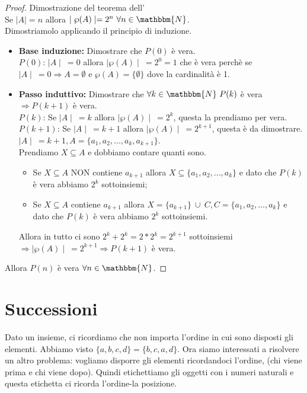 \documentclass[12pt, letterpaper]{report}
\newcommand{\namerefl}[1]{%
	\bgroup
	\let\nmu\MakeLowercase
	\nameref{#1}\egroup}
\newcommand{\nmu}{}
\begin{document}
 		\begin{proof}{Dimostrazione del teorema dell'\namerefl{th:insieme_parti}} \quad \\
 			Se $\mid A \mid = n$ allora $\mid \wp(A) \mid = 2^n \ \forall n \in \mathbbm{N}$.  \\
 			Dimostriamolo applicando il principio di induzione.
 			\begin{itemize}
 				\item \textbf{Base induzione:} Dimostrare che $P(0)$ è vera. \\
 				$P(0)$: $\mid A \mid \ = 0$ allora $\mid \wp(A) \mid \ = 2^0 = 1$ che è vera perchè se $\mid A \mid \ = 0 \Rightarrow A = \emptyset$ e $\wp(A) = \{\emptyset\}$ dove la cardinalità è 1.
 				\item \textbf{Passo induttivo:} Dimostrare che $\forall k \in \mathbbm{N} \ P(k)$ è vera $\Rightarrow P(k + 1)$ è vera. \\
 				$P(k)$: Se $\mid A \mid \ = k$ allora $\mid \wp(A) \mid \ = 2^k$, questa la prendiamo per vera.\\
 				$P(k + 1)$: Se $\mid A \mid \ = k + 1$ allora $\mid \wp(A) \mid \ = 2^{k+1}$, questa è da dimostrare.\\
 				$\mid A \mid \ = k + 1, A = \{a_1, a_2, ..., a_k, a_{k + 1}\}$.\\
 				Prendiamo $X \subseteq A$ e dobbiamo contare quanti sono.
 				\begin{itemize}
 					\item Se $X \subseteq A$ NON contiene $a_{k + 1}$ allora $X \subseteq \{a_1, a_2, ..., a_k\}$ e dato che $P(k)$ è vera abbiamo $2^k$ sottoinsiemi;
 					\item Se $X \subseteq A$ contiene $a_{k + 1}$ allora $X = \{a_{k + 1}\} \ \cup \ C, C = \{a_1, a_2, ..., a_k\}$ e dato che $P(k)$ è vera abbiamo $2^k$ sottoinsiemi.
 				\end{itemize}
 				Allora in tutto ci sono $2^k + 2^k = 2*2^k = 2^{k + 1}$ sottoinsiemi $\Rightarrow \mid \wp(A) \mid \ = 2^{k + 1} \Rightarrow P(k + 1)$ è vera.
 			\end{itemize}
 			Allora $P(n)$ è vera $\forall n \in \mathbbm{N}$.
 		\end{proof}
 		\chapter{Successioni}
 		Dato un insieme, ci ricordiamo che non importa l’ordine in cui sono disposti gli elementi. Abbiamo visto $\{a, b, c, d\} = \{b, c, a, d\}$.
 		Ora siamo interessati a risolvere un altro problema: vogliamo disporre gli elementi
 		ricordandoci l’ordine, (chi viene prima e chi viene dopo). Quindi etichettiamo gli oggetti
 		con i numeri naturali e questa etichetta ci ricorda l’ordine-la posizione.
\end{document}
